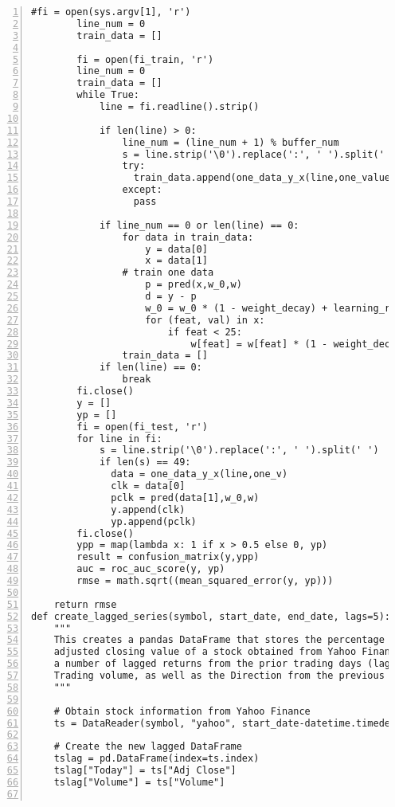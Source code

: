 \begin{lstlisting}[numbers=left, breaklines=true]
        #fi = open(sys.argv[1], 'r')
        line_num = 0
        train_data = []
        
        fi = open(fi_train, 'r')
        line_num = 0
        train_data = []
        while True:
            line = fi.readline().strip()
            
            if len(line) > 0:
                line_num = (line_num + 1) % buffer_num
                s = line.strip('\0').replace(':', ' ').split(' ')
                try:
                  train_data.append(one_data_y_x(line,one_value))
                except:
                  pass
                    
            if line_num == 0 or len(line) == 0:
                for data in train_data:
                    y = data[0]
                    x = data[1]
                # train one data
                    p = pred(x,w_0,w)
                    d = y - p
                    w_0 = w_0 * (1 - weight_decay) + learning_rate * d
                    for (feat, val) in x:
                        if feat < 25:
                            w[feat] = w[feat] * (1 - weight_decay) + learning_rate * d * val
                train_data = []
            if len(line) == 0:
                break
        fi.close()
        y = []
        yp = []
        fi = open(fi_test, 'r')
        for line in fi:
            s = line.strip('\0').replace(':', ' ').split(' ')
            if len(s) == 49:
              data = one_data_y_x(line,one_v)
              clk = data[0]
              pclk = pred(data[1],w_0,w)
              y.append(clk)
              yp.append(pclk)
        fi.close()
        ypp = map(lambda x: 1 if x > 0.5 else 0, yp)
        result = confusion_matrix(y,ypp)
        auc = roc_auc_score(y, yp)
        rmse = math.sqrt((mean_squared_error(y, yp)))
    
    return rmse
def create_lagged_series(symbol, start_date, end_date, lags=5):
    """
    This creates a pandas DataFrame that stores the percentage returns of the 
    adjusted closing value of a stock obtained from Yahoo Finance, along with 
    a number of lagged returns from the prior trading days (lags defaults to 5 days).
    Trading volume, as well as the Direction from the previous day, are also included.
    """

    # Obtain stock information from Yahoo Finance
    ts = DataReader(symbol, "yahoo", start_date-datetime.timedelta(days=365), end_date)

    # Create the new lagged DataFrame
    tslag = pd.DataFrame(index=ts.index)
    tslag["Today"] = ts["Adj Close"]
    tslag["Volume"] = ts["Volume"]


\end{lstlisting}
